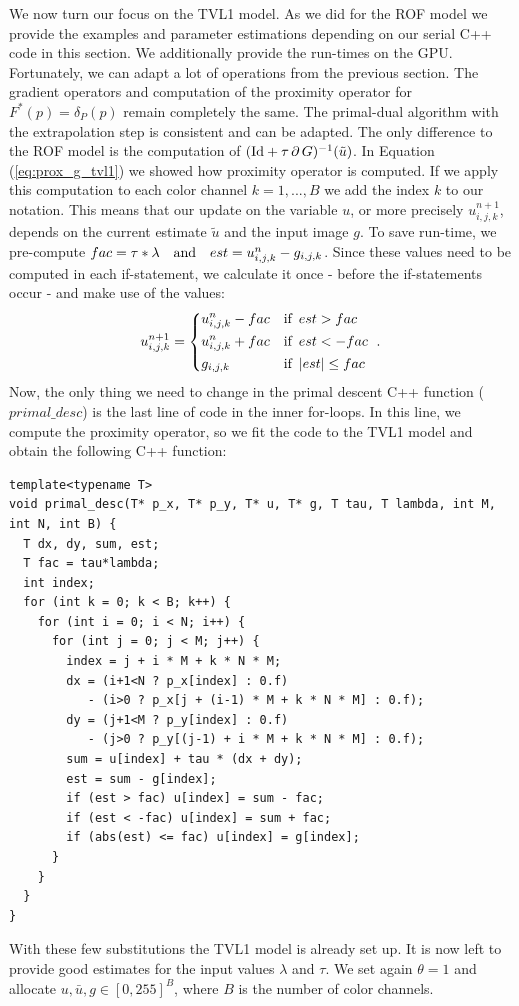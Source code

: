\documentclass[abstracton]{scrreprt}
\begin{document}
        We now turn our focus on the TVL1 model. As we did for the ROF model we provide the examples and parameter estimations depending on our serial C++ code in this section. We additionally provide the run-times on the GPU. Fortunately, we can adapt a lot of operations from the previous section. The gradient operators and computation of the proximity operator for $F^{\ast}(p) = \delta_{P}(p)$ remain completely the same. The primal-dual algorithm with the extrapolation step is consistent and can be adapted. The only difference to the ROF model is the computation of $(\textnormal{Id} + \tau\,\partial\,G)^{-1}(\tilde{u})$. In Equation (\ref{eq:prox_g_tvl1}) we showed how proximity operator is computed. If we apply this computation to each color channel $k = 1, ..., B$ we add the index $k$ to our notation. This means that our update on the variable $u$, or more precisely $u^{n+1}_{i,j,k}$, depends on the current estimate $\tilde{u}$ and the input image $g$. To save run-time, we pre-compute $fac = \tau * \lambda \,\,\,\,\,\, \textnormal{and} \,\,\,\,\,\, est = u^{n}_{i,j,k} - g_{i,j,k}$. Since these values need to be computed in each if-statement, we calculate it once - before the if-statements occur - and make use of the values:
            $$
                u^{n+1}_{i,j,k} = 
                    \begin{dcases*}
                        u^{n}_{i,j,k} - fac & \textnormal{if\, $est > fac$} \\
                        u^{n}_{i,j,k} + fac & \textnormal{if\, $est < - fac$} \\
                        g_{i,j,k} & \textnormal{if\, $|est| \le fac$}
                    \end{dcases*}.
            $$
        Now, the only thing we need to change in the primal descent C++ function ($primal\_desc$) is the last line of code in the inner for-loops. In this line, we compute the proximity operator, so we fit the code to the TVL1 model and obtain the following C++ function:
        \begin{lstlisting}
template<typename T>
void primal_desc(T* p_x, T* p_y, T* u, T* g, T tau, T lambda, int M, int N, int B) {
  T dx, dy, sum, est;
  T fac = tau*lambda;
  int index;
  for (int k = 0; k < B; k++) {
    for (int i = 0; i < N; i++) {
      for (int j = 0; j < M; j++) {
        index = j + i * M + k * N * M;
        dx = (i+1<N ? p_x[index] : 0.f)
           - (i>0 ? p_x[j + (i-1) * M + k * N * M] : 0.f);
        dy = (j+1<M ? p_y[index] : 0.f)
           - (j>0 ? p_y[(j-1) + i * M + k * N * M] : 0.f);
        sum = u[index] + tau * (dx + dy);
        est = sum - g[index];
        if (est > fac) u[index] = sum - fac;
        if (est < -fac) u[index] = sum + fac;
        if (abs(est) <= fac) u[index] = g[index];
      }
    }
  }
}
        \end{lstlisting} 
        With these few substitutions the TVL1 model is already set up. It is now left to provide good estimates for the input values $\lambda$ and $\tau$. We set again $\theta = 1$ and allocate $u, \bar{u}, g \in [0, 255]^{B}$, where $B$ is the number of color channels.
\end{document}
